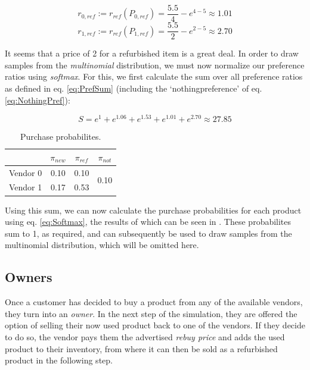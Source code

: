 \begin{equation}
	r_{0,ref} := r_{ref}(P_{0,ref}) = \frac{5.5}{4} - e^{4 - 5} \approx 1.01
\end{equation}
\begin{equation}
	r_{1,ref} := r_{ref}(P_{1,ref}) = \frac{5.5}{2} - e^{2 - 5} \approx 2.70
\end{equation}

It seems that a price of 2 for a refurbished item is a great deal. In order to draw samples from the \emph{multinomial} distribution, we must now normalize our preference ratios using \emph{softmax}. For this, we first calculate the sum over all preference ratios as defined in eq. \eqref{eq:PrefSum} (including the `nothingpreference' of eq. \eqref{eq:NothingPref}):

\begin{equation}
	S = e^{1} + e^{1.06} + e^{1.53} + e^{1.01} + e^{2.70} \approx 27.85
\end{equation}

\begin{table}
	\begin{tabular}{|r|c|c|c|}
		\hline
		         & \(\pi_{new}\) & \(\pi_{ref}\) & \(\pi_{not}\)         \\\hline
		Vendor 0 & 0.10          & 0.10          & \multirow{2}{*}{0.10} \\\cline{1-3}
		Vendor 1 & 0.17          & 0.53          &                       \\\hline
	\end{tabular}
	\caption{Purchase probabilites.}\label{tab:CustomerExampleSoftmax}
\end{table}

Using this sum, we can now calculate the purchase probabilities for each product using eq. \eqref{eq:Softmax}, the results of which can be seen in . These probabilites sum to 1, as required, and can subsequently be used to draw samples from the multinomial distribution, which will be omitted here.

\subsection{Owners}

Once a customer has decided to buy a product from any of the available vendors, they turn into an \emph{owner}. In the next step of the simulation, they are offered the option of selling their now used product back to one of the vendors. If they decide to do so, the vendor pays them the advertised \emph{rebuy price} and adds the used product to their inventory, from where it can then be sold as a refurbished product in the following step.

